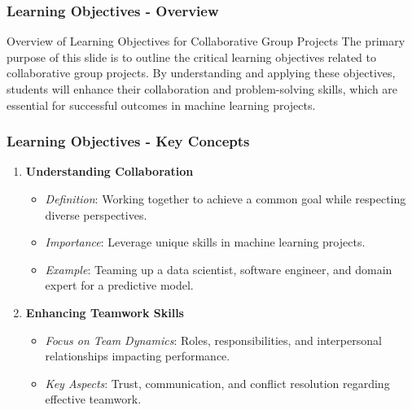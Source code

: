 \documentclass[aspectratio=169]{beamer}
\begin{document}
\begin{frame}[fragile]
    \frametitle{Learning Objectives - Overview}
    \begin{block}{Overview of Learning Objectives for Collaborative Group Projects}
        The primary purpose of this slide is to outline the critical learning objectives related to collaborative group projects. 
        By understanding and applying these objectives, students will enhance their collaboration and problem-solving skills, 
        which are essential for successful outcomes in machine learning projects.
    \end{block}
\end{frame}

\begin{frame}[fragile]
    \frametitle{Learning Objectives - Key Concepts}
    \begin{enumerate}
        \item \textbf{Understanding Collaboration}
        \begin{itemize}
            \item \textit{Definition}: Working together to achieve a common goal while respecting diverse perspectives.
            \item \textit{Importance}: Leverage unique skills in machine learning projects.
            \item \textit{Example}: Teaming up a data scientist, software engineer, and domain expert for a predictive model.
        \end{itemize}

        \item \textbf{Enhancing Teamwork Skills}
        \begin{itemize}
            \item \textit{Focus on Team Dynamics}: Roles, responsibilities, and interpersonal relationships impacting performance.
            \item \textit{Key Aspects}: Trust, communication, and conflict resolution regarding effective teamwork.
        \end{itemize}
    \end{enumerate}
\end{frame}
\end{document}
